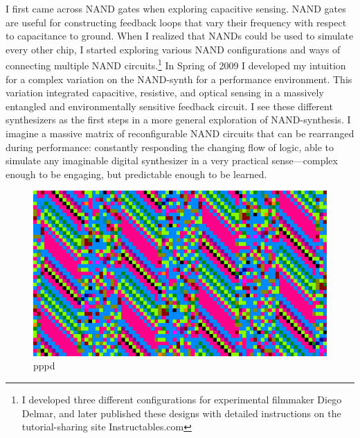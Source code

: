 \documentclass{thesis}
\begin{document}
I first came across NAND gates when exploring capacitive sensing. NAND gates are useful for constructing feedback loops that vary their frequency with respect to capacitance to ground. When I realized that NANDs could be used to simulate every other chip, I started exploring various NAND configurations and ways of connecting multiple NAND circuits.\footnote{I developed three different configurations for experimental filmmaker Diego Delmar, and later published these designs with detailed instructions on the tutorial-sharing site Instructables.com} In Spring of 2009 I developed my intuition for a complex variation on the NAND-synth for a performance environment. This variation integrated capacitive, resistive, and optical sensing in a massively entangled and environmentally sensitive feedback circuit. I see these different synthesizers as the first steps in a more general exploration of NAND-synthesis. I imagine a massive matrix of reconfigurable NAND circuits that can be rearranged during performance: constantly responding the changing flow of logic, able to simulate any imaginable digital synthesizer in a very practical sense---complex enough to be engaging, but predictable enough to be learned.

\begin{figure}
	\begin{center}
		\includegraphics[scale=.5]{graphics/pppd.png}
		\caption{pppd}
	\end{center}
\end{figure}
\end{document}
